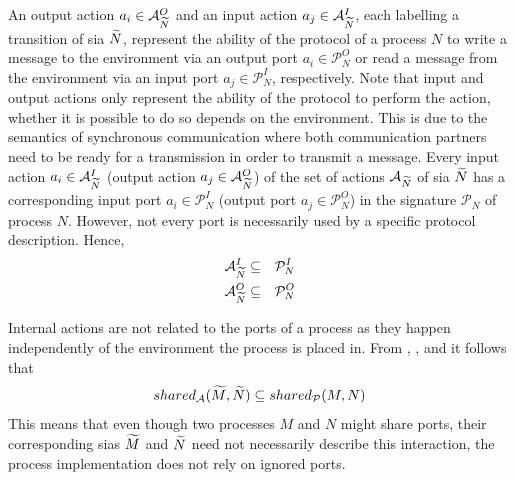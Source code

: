 An output action $a_i \in \mathcal{A}_{\widetilde{N}}^O$ and an input action $a_j \in \mathcal{A}_{\widetilde{N}}^I$, each labelling a transition of \gls{sia} $\widetilde{N}$, represent the ability of the protocol of a process $N$ to write a message to the environment via an output port $a_i \in \mathcal{P}_N^O$ or read a message from the environment via an input port $a_j \in \mathcal{P}_N^I$, respectively.
Note that input and output actions only represent the ability of the protocol to perform the action, whether it is possible to do so depends on the environment.
This is due to the semantics of synchronous communication where both communication partners need to be ready for a transmission in order to transmit a message.
Every input action $a_i \in \mathcal{A}_{\widetilde{N}}^I$ (output action $a_j \in \mathcal{A}_{\widetilde{N}}^O$) of the set of actions $\mathcal{A}_{\widetilde{N}}$ of \gls{sia} $\widetilde{N}$ has a corresponding input port $a_i \in \mathcal{P}_N^I$ (output port $a_j \in \mathcal{P}_N^O$) in the signature $\mathcal{P}_N$ of process $N$.
However, not every port is necessarily used by a specific protocol description.
Hence,
\begin{eqnarray}
    \label{eq_pi_ai}
    \mathcal{A}_{\widetilde{N}}^I & \subseteq & \mathcal{P}_N^I \\
    \label{eq_po_ao}
    \mathcal{A}_{\widetilde{N}}^O & \subseteq & \mathcal{P}_N^O
\end{eqnarray}

Internal actions are not related to the ports of a process as they happen independently of the environment the process is placed in.
From \Equ{\ref{eq_shared_ports}}, \Equ{\ref{eq_pi_ai}}, and \Equ{\ref{eq_po_ao}} it follows that
\begin{displaymath}
    shared_{\mathcal{A}}(\widetilde{M}, \widetilde{N}) \subseteq shared_{\mathcal{P}}(M, N)
\end{displaymath}
This means that even though two processes $M$ and $N$ might share ports, their corresponding \glspl{sia} $\widetilde{M}$ and $\widetilde{N}$ need not necessarily describe this interaction, \ie the process implementation does not rely on ignored ports.

